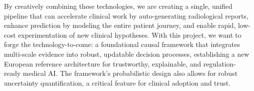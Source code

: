 \documentclass[11pt, a4paper]{article}
\begin{document}
By creatively combining these technologies, we are creating a single, unified pipeline that can accelerate clinical work by auto-generating radiological reports, enhance prediction by modeling the entire patient journey, and enable rapid, low-cost experimentation of new clinical hypotheses. With this project, we want to forge the technology-to-come: a foundational causal framework that integrates multi-scale evidence into robust, updatable decision processes, establishing a new European reference architecture for trustworthy, explainable, and regulation-ready medical AI. The framework's probabilistic design also allows for robust uncertainty quantification, a critical feature for clinical adoption and trust.




\end{document}
